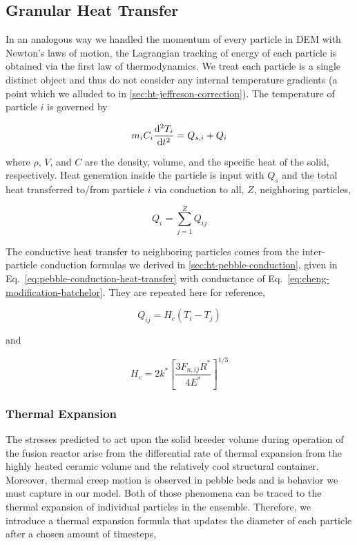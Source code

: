 \subsection{Granular Heat Transfer}\label{sec:dem-heat-transfer}

In an analogous way we handled the momentum of every particle in DEM with Newton's laws of motion, the Lagrangian tracking of energy of each particle is obtained via the first law of thermodynamics. We treat each particle is a single distinct object and thus do not consider any internal temperature gradients (a point which we alluded to in \cref{sec:ht-jeffreson-correction}). The temperature of particle $i$ is governed by

\begin{equation}\label{eq:thermoFirstLaw}
	m_iC_i\frac{\mathrm{d}^2{T_i}}{\mathrm{d}t^2} = Q_{s,i} + Q_{i}
\end{equation}

where $\rho$, $V$, and $C$ are the density, volume, and the specific heat of the solid, respectively. Heat generation inside the particle is input with $Q_{s}$ and the total heat transferred to/from particle $i$ via conduction to all, $Z$, neighboring particles,

\begin{equation}
	Q_i = \sum_{j=1}^Z Q_{ij}
\end{equation}

The conductive heat transfer to neighboring particles comes from the inter-particle conduction formulas we derived in \cref{sec:ht-pebble-conduction}, given in Eq.~\ref{eq:pebble-conduction-heat-transfer} with conductance of Eq.~\ref{eq:cheng-modification-batchelor}. They are repeated here for reference,

\begin{equation*}
	Q_{ij} = H_c(T_i - T_j)
\end{equation*} 

and

\begin{equation}\label{eq:dem-conductance}
	H_c= 2k^*\left[\frac{3F_{n,ij}R^*}{4E^*}\right]^{1/3}
\end{equation}

\subsubsection{Thermal Expansion}
The stresses predicted to act upon the solid breeder volume during operation of the fusion reactor arise from the differential rate of thermal expansion from the highly heated ceramic volume and the relatively cool structural container. Moreover, thermal creep motion is observed in pebble beds\cite{Tanigawa:2010cr, Vargas2007, Chen2009, Divoux2008} and is behavior we must capture in our model. Both of those phenomena can be traced to the thermal expansion of individual particles in the ensemble. Therefore, we introduce a thermal expansion formula that updates the diameter of each particle after a chosen amount of timesteps,

